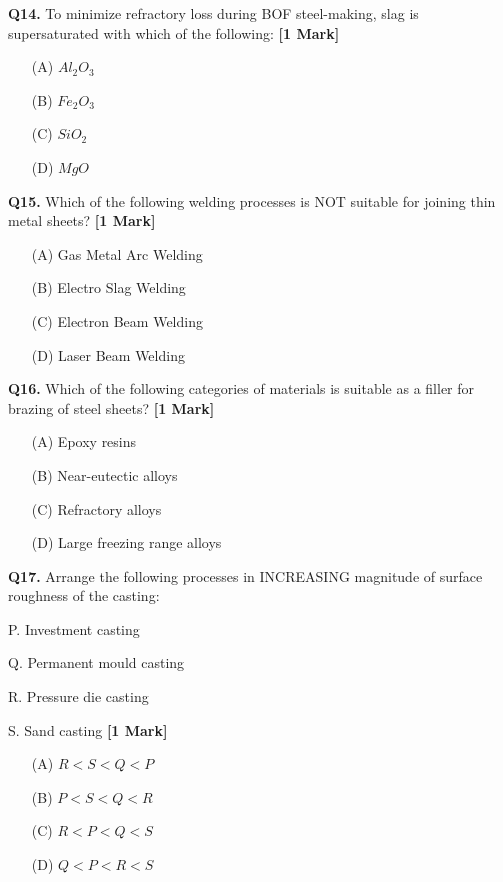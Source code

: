 \documentclass[11pt]{article}
\newcommand{\questiona}[2]{
    \noindent\textbf{Q#2.} #1 \hfill \textbf{[1 Mark]}
}
\begin{document}
\questiona{To minimize refractory loss during BOF steel-making, slag is supersaturated with which of the following:}{14}
\begin{enumerate}
    \item[(A)] \(Al_2O_3\)  
    \item[(B)] \(Fe_2O_3\)  
    \item[(C)] \(SiO_2\)  
    \item[(D)] \(MgO\)  
\end{enumerate}
\vspace{0.5cm}

\questiona{Which of the following welding processes is NOT suitable for joining thin metal sheets?}{15}
\begin{enumerate}
    \item[(A)] Gas Metal Arc Welding  
    \item[(B)] Electro Slag Welding  
    \item[(C)] Electron Beam Welding  
    \item[(D)] Laser Beam Welding  
\end{enumerate}
\vspace{0.5cm}

\questiona{Which of the following categories of materials is suitable as a filler for brazing of steel sheets?}{16}
\begin{enumerate}
    \item[(A)] Epoxy resins  
    \item[(B)] Near-eutectic alloys  
    \item[(C)] Refractory alloys  
    \item[(D)] Large freezing range alloys  
\end{enumerate}
\vspace{0.5cm}

\questiona{Arrange the following processes in INCREASING magnitude of surface roughness of the casting:  

P. Investment casting  

Q. Permanent mould casting  

R. Pressure die casting  

S. Sand casting}{17}
\begin{enumerate}
    \item[(A)] $R < S < Q < P $ 
    \item[(B)] $P < S < Q < R  $
    \item[(C)] $R < P < Q < S $ 
    \item[(D)]$ Q < P < R < S  $
\end{enumerate}
\vspace{0.5cm}
\end{document}
